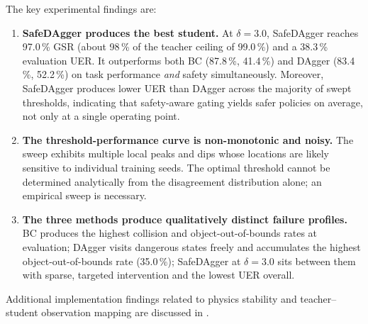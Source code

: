 The key experimental findings are:

\begin{enumerate}
    \item \textbf{SafeDAgger produces the best student.}  At $\delta = 3.0$, SafeDAgger reaches 97.0\,\% \ac{GSR} (about 98\,\% of the teacher ceiling of 99.0\,\%) and a 38.3\,\% evaluation \ac{UER}.  It outperforms both \ac{BC} (87.8\,\%, 41.4\,\%) and DAgger (83.4\,\%, 52.2\,\%) on task performance \emph{and} safety simultaneously.  Moreover, SafeDAgger produces lower \ac{UER} than DAgger across the majority of swept thresholds, indicating that safety-aware gating yields safer policies on average, not only at a single operating point.
    \item \textbf{The threshold-performance curve is non-monotonic and noisy.}  The sweep exhibits multiple local peaks and dips whose locations are likely sensitive to individual training seeds.  The optimal threshold cannot be determined analytically from the disagreement distribution alone; an empirical sweep is necessary.
    \item \textbf{The three methods produce qualitatively distinct failure profiles.}  \ac{BC} produces the highest collision and object-out-of-bounds rates at evaluation; DAgger visits dangerous states freely and accumulates the highest object-out-of-bounds rate (35.0\,\%); SafeDAgger at $\delta = 3.0$ sits between them with sparse, targeted intervention and the lowest \ac{UER} overall.
\end{enumerate}

Additional implementation findings related to physics stability and teacher--student observation mapping are discussed in .
%
